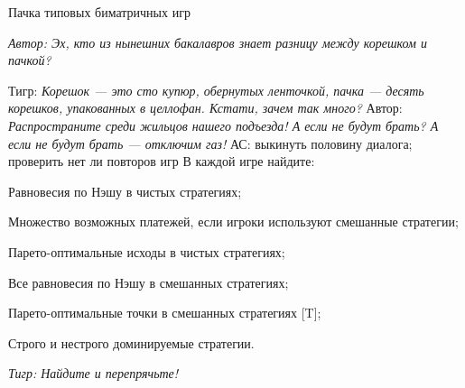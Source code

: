 \begin{problem}
 Пачка типовых биматричных игр\par
{\it Автор:  Эх, кто из нынешних бакалавров знает разницу между корешком и пачкой?}\par
Тигр: {\it Корешок — это сто купюр, обернутых ленточкой, пачка — десять корешков, упакованных в целлофан. Кстати, зачем так много? }
Автор: {\it Распространите среди жильцов нашего подъезда! А если не будут брать? А если не будут брать — отключим газ!}
{\red АС: выкинуть половину диалога; проверить нет ли повторов игр}
В каждой игре найдите: \par
Равновесия по Нэшу в чистых стратегиях;\par
Множество возможных платежей, если игроки используют смешанные стратегии;\par
Парето-оптимальные исходы в чистых стратегиях;\par
Все равновесия по Нэшу в смешанных стратегиях;\par
Парето-оптимальные точки в смешанных стратегиях [T];\par
Строго и нестрого доминируемые стратегии.\par
{\it Тигр: Найдите и перепрячьте!}\par


\end{problem}

